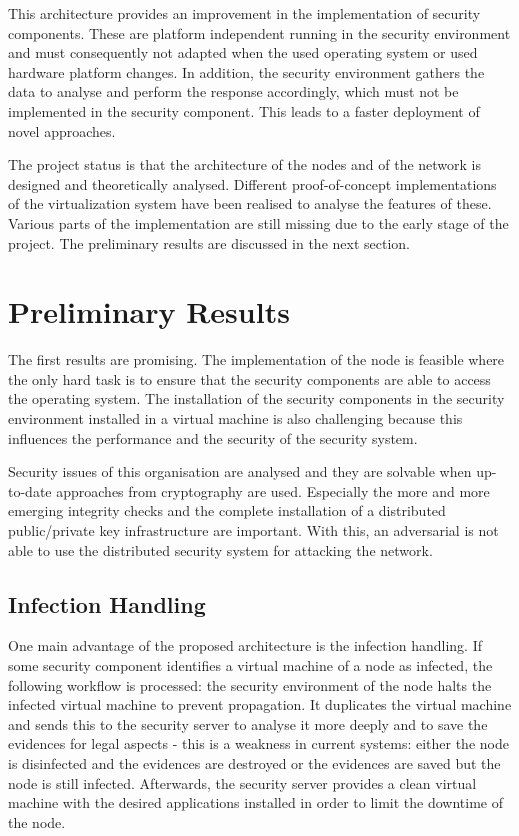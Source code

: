 \documentclass[conference,10pt,a4]{IEEEtran}
\begin{document}
This architecture provides an improvement in the implementation of security components. These are platform independent running in the security environment and must consequently not adapted when the used operating system or used hardware platform changes. In addition, the security environment gathers the data to analyse and perform the response accordingly, which must not be implemented in the security component. This leads to a faster deployment of novel approaches.

The project status is that the architecture of the nodes and of the network is designed and theoretically analysed. Different proof-of-concept implementations of the virtualization system have been realised to analyse the features of these. Various parts of the implementation are still missing due to the early stage of the project. The preliminary results are discussed in the next section.

\section{Preliminary Results}
The first results are promising. The implementation of the node is feasible where the only hard task is to ensure that the security components are able to access the operating system. The installation of the security components in the security environment installed in a virtual machine is also challenging because this influences the performance and the security of the security system. 

Security issues of this organisation are analysed and they are solvable when up-to-date approaches from cryptography are used. Especially the more and more emerging integrity checks and the complete installation of a distributed public/private key infrastructure are important. With this, an adversarial is not able to use the distributed security system for attacking the network.

\subsection{Infection Handling}
One main advantage of the proposed architecture is the infection handling. If some security component identifies a virtual machine of a node as infected, the following workflow is processed: the security environment of the node halts the infected virtual machine to prevent propagation. It duplicates the virtual machine and sends this to the security server to analyse it more deeply and to save the evidences for legal aspects - this is a weakness in current systems: either the node is disinfected and the evidences are destroyed or the evidences are saved but the node is still infected. Afterwards, the security server provides a clean virtual machine with the desired applications installed in order to limit the downtime of the node.
\end{document}
